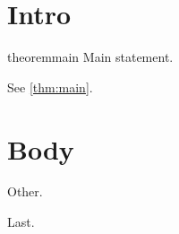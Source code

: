 \documentclass{article}
\begin{document}
\section{Intro}
\begin{restatable*}{theorem}{main}\label{thm:main}
Main statement.
\end{restatable*}
See \ref{thm:main}.
\main*
\section{Body}
\begin{theorem}
Other.
\end{theorem}
\main
\begin{theorem}
Last.
\end{theorem}
\end{document}
